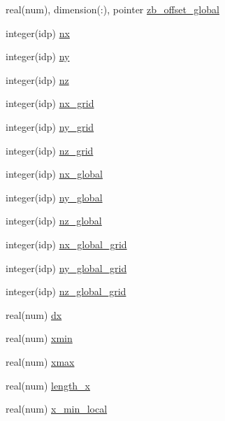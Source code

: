 \begin{DoxyCompactItemize}
\item 
real(num), dimension(\+:), pointer \hyperlink{namespaceshared__data_afbe25de83b836cecc5e144cdee8fbb3e}{zb\+\_\+offset\+\_\+global}
\item 
integer(idp) \hyperlink{namespaceshared__data_ac04f4ac48d632f67068e3623d39b847d}{nx}
\item 
integer(idp) \hyperlink{namespaceshared__data_a93124935df137a6ba362bdc8dcba6d5f}{ny}
\item 
integer(idp) \hyperlink{namespaceshared__data_ad701bfe58518b2efa7568d9d92d4d99a}{nz}
\item 
integer(idp) \hyperlink{namespaceshared__data_aa73479038f32b1c04369ee19f989a864}{nx\+\_\+grid}
\item 
integer(idp) \hyperlink{namespaceshared__data_a27d84fa0143fefa733f5915a29ee2280}{ny\+\_\+grid}
\item 
integer(idp) \hyperlink{namespaceshared__data_a316d1007b26804f619b2863d225113b4}{nz\+\_\+grid}
\item 
integer(idp) \hyperlink{namespaceshared__data_aacbd3bff423894ff20cec97f4286ba68}{nx\+\_\+global}
\item 
integer(idp) \hyperlink{namespaceshared__data_a09d6529711aae354967f6d5db76220c1}{ny\+\_\+global}
\item 
integer(idp) \hyperlink{namespaceshared__data_a4d554ba2caa9b741974e24ab105829e7}{nz\+\_\+global}
\item 
integer(idp) \hyperlink{namespaceshared__data_a57f53cc0b24ace5f77db7a6a1835f7fb}{nx\+\_\+global\+\_\+grid}
\item 
integer(idp) \hyperlink{namespaceshared__data_acbb834ec9e8d36f975728eb709cffebb}{ny\+\_\+global\+\_\+grid}
\item 
integer(idp) \hyperlink{namespaceshared__data_aa95da47815e254e9835494899a595174}{nz\+\_\+global\+\_\+grid}
\item 
real(num) \hyperlink{namespaceshared__data_a0d718dcaae94920d7faaa4aa47011d5b}{dx}
\item 
real(num) \hyperlink{namespaceshared__data_a14da8910f32ccb1127e00fdf5dd9afbc}{xmin}
\item 
real(num) \hyperlink{namespaceshared__data_abf7145e6fa97e6f2650f0c09c8818b58}{xmax}
\item 
real(num) \hyperlink{namespaceshared__data_a3830a10a1c318950b0429ab6b6cd01c0}{length\+\_\+x}
\item 
real(num) \hyperlink{namespaceshared__data_a4a7c4b6eb045c3017f04dc08eb5cddcd}{x\+\_\+min\+\_\+local}
\item 

\end{DoxyCompactItemize}

